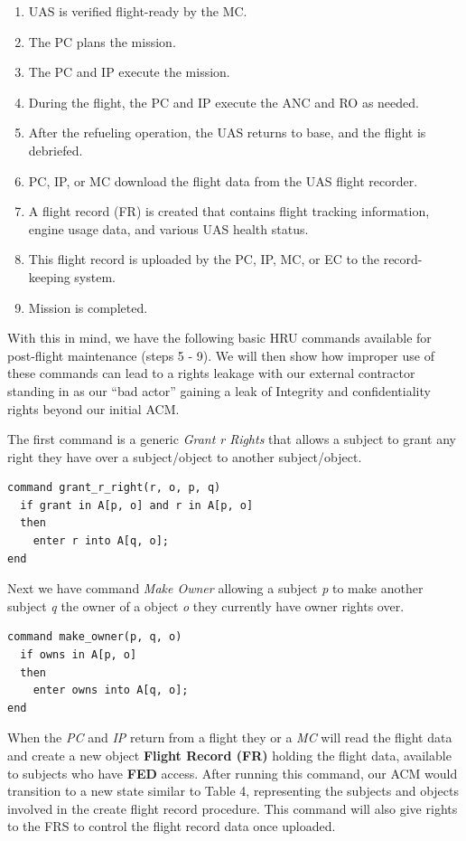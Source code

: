 \documentclass[10pt,journal,compsoc]{IEEEtran}
\begin{document}
  \begin{enumerate}
    \item UAS is verified flight-ready by the MC.
    \item The PC plans the mission.
    \item The PC and IP execute the mission.
    \item During the flight, the PC and IP execute the ANC and RO as needed.
    \item After the refueling operation, the UAS returns to base, and the flight is debriefed. 
    \item PC, IP, or MC download the flight data from the UAS flight recorder. 
    \item A flight record (FR) is created that contains flight tracking information, engine usage data, and various UAS health status.
    \item This flight record is uploaded by the PC, IP, MC, or EC to the record-keeping system. 
    \item Mission is completed. 
  \end{enumerate}
  
  With this in mind, we have the following basic HRU commands available for post-flight maintenance (steps 5 - 9). We will then show how improper use of these commands can lead to a rights leakage with our external contractor standing in as our ``bad actor'' gaining a leak of Integrity and confidentiality rights beyond our initial ACM. 

  The first command is a generic \textit{Grant r Rights} that allows a subject to grant any right they have over a subject/object to another subject/object.

\begin{lstlisting}
command grant_r_right(r, o, p, q)
  if grant in A[p, o] and r in A[p, o]
  then
    enter r into A[q, o];
end
\end{lstlisting}
    
  Next we have command \textit{Make Owner} allowing a subject \textit{p} to make another subject \textit{q} the owner of a object \textit{o} they currently have owner rights over. 

\begin{lstlisting}
command make_owner(p, q, o)
  if owns in A[p, o]
  then
    enter owns into A[q, o];
end
\end{lstlisting}
  
  When the \textit{PC} and \textit{IP} return from a flight they or a \textit{MC} will read the flight data and create a new object \textbf{Flight Record (FR)} holding the flight data, available to subjects who have \textbf{FED} access. 
  After running this command, our ACM would transition to a new state similar to Table 4, representing the subjects and objects involved in the create flight record procedure. 
  This command will also give rights to the FRS to control the flight record data once uploaded.
  
\end{document}
